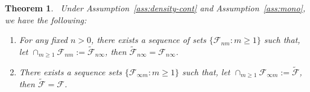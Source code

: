 \documentclass[12pt,leqno]{amsart}
\newtheorem{theorem}{Theorem}
\begin{document}
\begin{theorem}~\label{thm: feasible-set-conv} 
Under Assumption~\ref{ass:density-cont} and Assumption~\ref{ass:mono}, we have the following:
\begin{enumerate}[label={(\roman*)},itemindent=1em]
\item For any fixed $n>0$, there exists a sequence of sets $\{\mathcal{F}_{nm}: m \geq 1\}$ such that, let $\cap_{m\geq 1} \mathcal{F}_{nm}:= \tilde{\mathcal{F}}_{n\infty}$, then $ \tilde{\mathcal{F}}_{n\infty} = \mathcal{F}_{n\infty}$.\label{thm: feasible-set-conv1} 
\item There exists a sequence sets $\{\mathcal{F}_{\infty m}: m \geq 1\}$ such that, let $\cap_{m\geq 1} \mathcal{F}_{\infty m}:= \tilde{\mathcal{F}}$, then $ \tilde{\mathcal{F}} = \mathcal{F}$. \label{thm: feasible-set-conv2} 
\end{enumerate}
\end{theorem}
\end{document}
